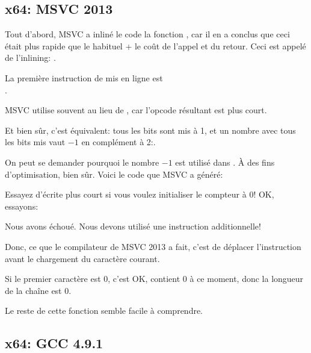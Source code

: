 ﻿\subsection{x64: MSVC 2013 \Optimizing}



Tout d'abord, MSVC a inliné le code la fonction \strlen{}, car il en a conclus que
ceci était plus rapide que le \strlen{} habituel + le coût de l'appel et du retour.
Ceci est appelé de l'inlining: .

\label{using_OR_instead_of_MOV}
La première instruction de \strlen{} mis en ligne est\\
. 

MSVC utilise souvent  au lieu de , car l'opcode
résultant est plus court.

Et bien sûr, c'est équivalent: tous les bits sont mis à 1, et un nombre avec tous
les bits mis vaut $-1$ en complément à 2:.

On peut se demander pourquoi le nombre $-1$ est utilisé dans \strlen{}.
À des fins d'optimisation, bien sûr.
Voici le code que MSVC a généré:



Essayez d'écrite plus court si vous voulez initialiser le compteur à 0!
OK, essayons:



Nous avons échoué. Nous devons utilisé une instruction  additionnelle!

Donc, ce que le compilateur de MSVC 2013 a fait, c'est de déplacer l'instruction
 avant le chargement du caractère courant.

Si le premier caractère est 0, c'est OK, \RAX contient 0 à ce moment, donc la longueur
de la chaîne est 0.

Le reste de cette fonction semble facile à comprendre.

\subsection{x64: GCC 4.9.1 \NonOptimizing}

